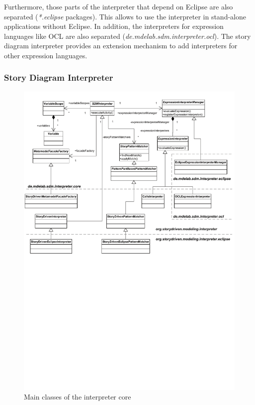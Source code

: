 Furthermore, those parts of the interpreter that depend on Eclipse are also separated (\emph{*.eclipse} packages). 
This allows to use the interpreter in stand-alone applications without Eclipse. 
In addition, the interpreters for expression languages like OCL are also separated (\emph{de.mdelab.sdm.interpreter.ocl}). 
The story diagram interpreter provides an extension mechanism to add interpreters for other expression languages.

\subsubsection{Story Diagram Interpreter}
\label{sec:sdm_interpreter}

\begin{figure}[htb]
  \centering
  \includegraphics[width=1.0\columnwidth]{./figures/interpreter_core.pdf}
  \caption{Main classes of the interpreter core}
  \label{fig:sdm_interpreter}
\end{figure}

